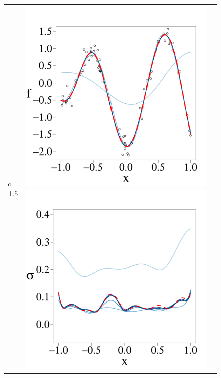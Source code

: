 \documentclass[onecolumn,a4paper,11pt]{article}
\begin{document}
\begin{figure}
\begin{tabular}{ c c c }
\cline{1-2}
c = 1.5 &
\includegraphics[scale=0.215, trim = 0mm 14mm 0mm 14mm, clip]{ch5_fig3_Post_part4.pdf} 
\includegraphics[scale=0.215, trim = 0mm 14mm 0mm 14mm, clip]{ch5_fig3_Sigma_part4.pdf} 

\end{tabular}
\end{figure}
\end{document}
